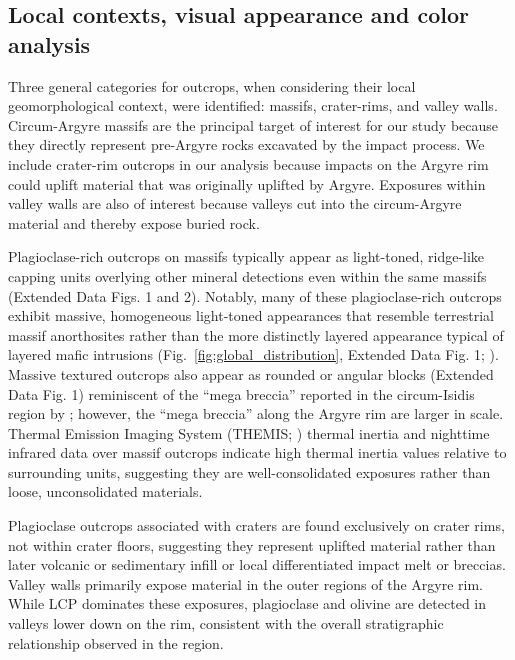 \documentclass[11pt]{article}
\begin{document}
\subsection*{Local contexts, visual appearance and color analysis}

Three general categories for outcrops, when considering their local geomorphological context, were identified: massifs, crater-rims, and valley walls. Circum-Argyre massifs are the principal target of interest for our study because they directly represent pre-Argyre rocks excavated by the impact process. We include crater-rim outcrops in our analysis because impacts on the Argyre rim could uplift material that was originally uplifted by Argyre. Exposures within valley walls are also of interest because valleys cut into the circum-Argyre material and thereby expose buried rock.

Plagioclase-rich outcrops on massifs typically appear as light-toned, ridge-like capping units overlying other mineral detections even within the same massifs (Extended Data Figs. 1 and 2). Notably, many of these plagioclase-rich outcrops exhibit massive, homogeneous light-toned appearances that resemble terrestrial massif anorthosites rather than the more distinctly layered appearance typical of layered mafic intrusions (Fig.~\ref{fig:global_distribution}, Extended Data Fig. 1; \citealt{Ashwal1993}). Massive textured outcrops also appear as rounded or angular blocks (Extended Data Fig. 1) reminiscent of the ``mega breccia'' reported in the circum-Isidis region by \citet{Scheller2020}; however, the ``mega breccia'' along the Argyre rim are larger in scale. Thermal Emission Imaging System (THEMIS; \citealt{Christensen2004}) thermal inertia \citep{Fergason2006} and nighttime infrared data \citep{Edwards2011} over massif outcrops indicate high thermal inertia values relative to surrounding units, suggesting they are well-consolidated exposures rather than loose, unconsolidated materials.

Plagioclase outcrops associated with craters are found exclusively on crater rims, not within crater floors, suggesting they represent uplifted material rather than later volcanic or sedimentary infill or local differentiated impact melt or breccias. Valley walls primarily expose material in the outer regions of the Argyre rim. While LCP dominates these exposures, plagioclase and olivine are detected in valleys lower down on the rim, consistent with the overall stratigraphic relationship observed in the region.
\end{document}
